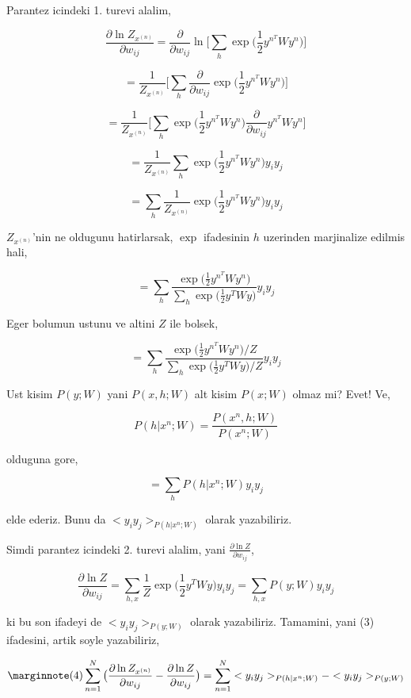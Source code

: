 \documentclass[12pt,fleqn]{article}\usepackage{../common}
\begin{document}
Parantez icindeki 1. turevi alalim,

$$ 
\frac{\partial \ln Z_{x^{(n)}} }{\partial w_{ij}} = 
\frac{\partial }{\partial w_{ij}}  
\ln \bigg[ 
\sum_h \exp \big( \frac{1}{2} y^{n^T} W y^n \big) 
\bigg]
$$

$$ 
= \frac{1}{Z_{x^{(n)}}}  \bigg[ \sum_h \frac{\partial }{\partial w_{ij}} \exp \big( \frac{1}{2} y^{n^T} W y^n  \big) \bigg]
$$

$$ 
= \frac{1}{Z_{x^{(n)}}}  
\bigg[ 
\sum_h  \exp \big( \frac{1}{2} y^{n^T} W y^n  \big) 
\frac{\partial }{\partial w_{ij}} y^{n^T} W y^n 
\bigg]
$$

$$ 
= \frac{1}{Z_{x^{(n)}}}  \sum_h  \exp \big( \frac{1}{2} y^{n^T} W y^n  \big) y_iy_j
$$


$$ 
= \sum_h  \frac{1}{Z_{x^{(n)}}}  \exp \big( \frac{1}{2} y^{n^T} W y^n  \big) y_iy_j
$$

$Z_{x^{(n)}}$'nin ne oldugunu hatirlarsak, $\exp$ ifadesinin $h$ uzerinden
marjinalize edilmis hali,

$$ 
= \sum_h  \frac{\exp \big( \frac{1}{2} y^{n^T} W y^n  \big)}
{\sum_h \exp \big( \frac{1}{2} y^T W y \big) } 
y_iy_j
$$

Eger bolumun ustunu ve altini $Z$ ile bolsek,

$$ 
= \sum_h  
\frac{\exp \big( \frac{1}{2} y^{n^T} W y^n  \big) / Z} 
{\sum_h \exp \big( \frac{1}{2} y^T W y \big) / Z} 
y_iy_j
$$

Ust kisim $P(y;W)$ yani $P(x,h;W) $ alt kisim $P(x;W)$ olmaz mi? Evet! Ve,


$$ P(h|x^n;W) = \frac{P(x^n,h;W)}{P(x^n;W)}  $$

olduguna gore, 

$$ =  \sum_h P(h|x^n;W) y_iy_j $$

elde ederiz. Bunu da $<y_iy_j>_{P(h|x^n;W)}$ olarak yazabiliriz. 

Simdi parantez icindeki 2. turevi alalim, yani $\frac{\partial \ln Z }{\partial w_{ij}} $,

$$ 
\frac{\partial \ln Z }{\partial w_{ij}}  = 
\sum_{h,x} \frac{1}{Z}  \exp \big( \frac{1}{2} y^{T} W y  \big) y_iy_j =
\sum_{h,x} P(y;W)  y_iy_j
$$

ki bu son ifadeyi de $<y_iy_j>_{P(y;W)}$ olarak yazabiliriz. Tamamini,
yani (3) ifadesini, artik soyle yazabiliriz,

$$
\mlabel{4}
\sum_{n=1}^{N}  \big( \frac{\partial \ln Z_{x^{(n)}} }{\partial w_{ij}} - \frac{\partial \ln Z }{\partial w_{ij}} \big)
= \sum_{n=1}^{N}  <y_iy_j>_{P(h|x^n;W)} - <y_iy_j>_{P(y;W)}
$$
\end{document}
